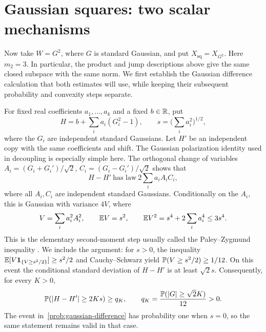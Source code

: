 \section{Gaussian squares: two scalar mechanisms}\label{sec:gaussian}


Now take $W=G^2$, where $G$ is standard Gaussian, and put
$X_{\mathrm{sq}}=X_{G^2}$.  Here $m_2=3$.  In particular, the product and
jump descriptions above give the same closed subspace with the same norm.
We first establish the Gaussian difference calculation that both estimates
will use, while keeping their subsequent probability and convexity steps
separate.

For fixed real coefficients $a_1,\ldots,a_k$ and a fixed $b\in\mathbb R$, put
\[
 H=b+\sum_i a_i(G_i^2-1),\qquad
 s=\Big(\sum_i a_i^2\Big)^{1/2},
\]
where the $G_i$ are independent standard Gaussians.  Let $H'$ be an
independent copy with the same coefficients and shift.  The Gaussian polarization identity used in decoupling
\cite[proof of Lemma~3.2]{LevinaVershynin2012} is especially simple here.
The orthogonal
change of variables
$A_i=(G_i+G_i')/\sqrt2$, $C_i=(G_i-G_i')/\sqrt2$ shows that
\[
 H-H'\ \text{has law}\ 2\sum_i a_iA_iC_i,
\]
where all $A_i,C_i$ are independent standard Gaussians.  Conditionally on
the $A_i$, this is Gaussian with variance $4V$, where
\[
 V=\sum_i a_i^2A_i^2,\qquad
 \mathbb E V=s^2,\qquad
 \mathbb E V^2=s^4+2\sum_i a_i^4\le3s^4.
\]
This is the elementary second-moment step usually called the
Paley--Zygmund inequality \cite{PaleyZygmund1932Series,PaleyZygmund1932Note}.
We include the argument: for $s>0$, the inequality
$\mathbb E[V\mathbf1_{\{V\ge s^2/2\}}]\ge s^2/2$ and Cauchy--Schwarz yield
$\mathbb P(V\ge s^2/2)\ge1/12$.  On this event the conditional standard
deviation of $H-H'$ is at least $\sqrt2s$.  Consequently, for every $K>0$,
\begin{equation}\label{prob:gaussian-difference}
 \mathbb P(|H-H'|\ge2Ks)
 \ge q_K,\qquad q_K=\frac{\mathbb P(|G|\ge\sqrt2K)}{12}>0.
\end{equation}
The event in~\eqref{prob:gaussian-difference} has probability one when
$s=0$, so the same statement remains valid in that case.

